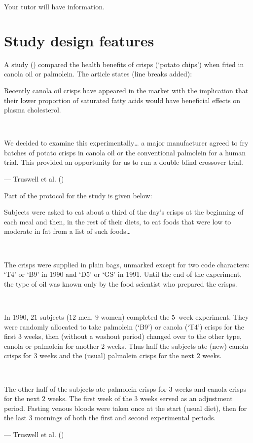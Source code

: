 \documentclass[
  11pt,
  a4paper,
  krantz2]{krantz}
\makeatletter
\renewenvironment{quote}%
{\begin{kframe}}
{\end{kframe}}
\newenvironment{kframe}{%
\medskip{}
\setlength{\fboxsep}{.8em}
 \def\at@end@of@kframe{}%
 \ifinner\ifhmode%
  \def\at@end@of@kframe{\end{minipage}}%
  \begin{minipage}{\columnwidth}%
 \fi\fi%
 \def\FrameCommand##1{\hskip\@totalleftmargin \hskip-\fboxsep
 \colorbox{shadecolor}{##1}\hskip-\fboxsep
     \hskip-\linewidth \hskip-\@totalleftmargin \hskip\columnwidth}%
 \MakeFramed {\advance\hsize-\width
   \@totalleftmargin\z@ \linewidth\hsize
   \@setminipage}}%
 {\par\unskip\endMakeFramed%
 \at@end@of@kframe}
\renewenvironment{quote}
               {\list{}{\vspace{-0.5em}\begin{kframe}\small%
                        \rightmargin   \leftmargin
                        \parsep        \z@ \@plus\p@}%
                \item\relax}
               {\end{kframe}\endlist}
\makeatother
\begin{document}
Your tutor will have
information.

\section{Study design features}\label{StudyFeatures}

A study () compared the health benefits of crisps (`potato chips') when fried in canola oil or palmolein.
The article states (line breaks added):

\begin{quote}
Recently canola oil crisps have appeared in the market with the implication that their lower proportion of saturated fatty acids would have beneficial effects on plasma cholesterol.\\
\strut ~

We decided to examine this experimentally\ldots{} a major manufacturer agreed to fry batches of potato crisps in canola oil or the conventional palmolein for a human trial.
This provided an opportunity for us to run a double blind crossover trial.

--- Truswell et al. ()
\end{quote}

Part of the protocol for the study is given below:

\begin{quote}
Subjects were asked to eat about a third of the day's crisps at the beginning of each meal and then, in the rest of their diets, to eat foods that were low to moderate in fat from a list of such foods\ldots{}\\
\strut ~

The crisps were supplied in plain bags, unmarked except for two code characters: `T4' or `B9' in 1990 and `D5' or `GS' in 1991.
Until the end of the experiment, the type of oil was known only by the food scientist who prepared the crisps.\\
\strut ~

In 1990, \(21\) subjects (\(12\) men, \(9\) women) completed the \(5\)~week experiment.
They were randomly allocated to take palmolein (`B9') or canola (`T4') crisps for the first \(3\) weeks, then (without a washout period) changed over to the other type, canola or palmolein for another \(2\) weeks.
Thus half the subjects ate (new) canola crisps for \(3\) weeks and the (usual) palmolein crisps for the next \(2\) weeks.\\
\strut ~

The other half of the subjects ate palmolein crisps for \(3\) weeks and canola crisps for the next \(2\) weeks.
The first week of the \(3\) weeks served as an adjustment period.
Fasting venous bloods were taken once at the start (usual diet), then for the last \(3\) mornings of both the first and second experimental periods.

--- Truswell et al. ()
\end{quote}
\end{document}
